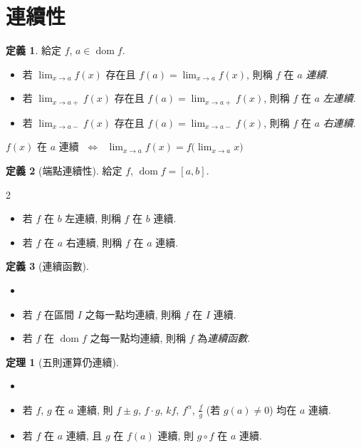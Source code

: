 \documentclass[12pt]{extarticle}
\newcommand{\ds}{\displaystyle}
\newcommand{\ifff}{\;\Longleftrightarrow\;}
\DeclareMathOperator*{\dom}{dom}
\theoremstyle{definition}
\newtheorem*{dfn}{定義}
\newtheorem*{thm}{定理}
\begin{document}
\section*{連續性}

\begin{dfn} 給定 $f$, $a\in\dom f$. 
  \begin{itemize}\setlength\itemsep{0em}
    \item 若 $\ds\lim_{x\to a} f(x)$ 存在且 $\ds f(a)=\lim_{x\to a}f(x)$, 則稱 $f$ 在 $a$ \emph{連續}.  
    \item 若 $\ds\lim_{x\to a+} f(x)$ 存在且 $\ds f(a)=\lim_{x\to a+}f(x)$, 則稱 $f$ 在 $a$ \emph{左連續}.  
    \item 若 $\ds\lim_{x\to a-} f(x)$ 存在且 $\ds f(a)=\lim_{x\to a-}f(x)$, 則稱 $f$ 在 $a$ \emph{右連續}.  
  \end{itemize}
  $f(x)$ 在 $a$ 連續 $\ifff$ $\ds\lim_{x\to a}f(x) = f\big(\lim_{x\to a}x\big)$
\end{dfn}

\begin{dfn}[端點連續性]
  給定 $f$, $\dom f = [a, b]$.  
  \begin{multicols}{2}
    \begin{itemize}\setlength\itemsep{0em}
      \item 若 $f$ 在 $b$ 左連續, 則稱 $f$ 在 $b$ 連續.  
      \item 若 $f$ 在 $a$ 右連續, 則稱 $f$ 在 $a$ 連續.  
    \end{itemize}
  \end{multicols}
\end{dfn}

\begin{dfn}[連續函數] 
  \begin{itemize}\setlength\itemsep{0em}
    \item[]
    \item 若 $f$ 在區間 $I$ 之每一點均連續, 則稱 $f$ 在 $I$ 連續.  
    \item 若 $f$ 在 $\dom f$ 之每一點均連續, 則稱 $f$ 為\emph{連續函數}.  
  \end{itemize}
\end{dfn}

\begin{thm}[五則運算仍連續]
  \begin{itemize}\setlength\itemsep{0em}
    \item[] 
    \item 若 $f$, $g$ 在 $a$ 連續, 則 $f\pm g$, $f\cdot g$, $k f$, $f^\alpha$, $\ds\frac{f}{g}$ (若 $g(a)\ne 0$) 均在 $a$ 連續. 
    \item 若 $f$ 在 $a$ 連續, 且 $g$ 在 $f(a)$ 連續, 則 $g\circ f$ 在 $a$ 連續. 
  \end{itemize}
\end{thm}
\end{document}
